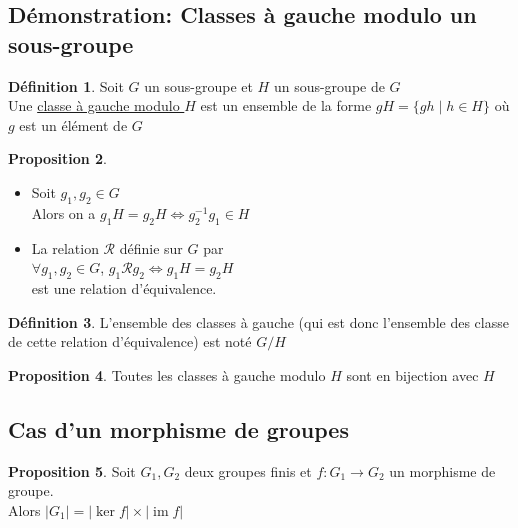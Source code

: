 \documentclass[10pt,a4paper]{article}
\theoremstyle{definition}
\newtheorem{proposition}{Proposition}[section]
\newtheorem{definition}[proposition]{Définition}
\DeclareMathOperator{\im}{im}
\begin{document}
\subsection{Démonstration: Classes à gauche modulo un sous-groupe}
\begin{definition}
Soit $G$ un sous-groupe et $H$ un sous-groupe de $G$ \\
Une \uline{classe à gauche modulo $H$} est un ensemble de la forme $g H = \{ g h \mid h \in H \}$ où $g$ est un élément de $G$
\end{definition}
\begin{proposition}
\begin{itemize}
\item Soit $g_1, g_2 \in G$ \\
Alors on a $g_1 H = g_2 H \iff g_2^{-1} g_1 \in H$
\item La relation $\mathcal{R}$ définie sur $G$ par \\
$\forall g_1, g_2 \in G$, $g_1 \mathcal{R} g_2 \iff g_1 H = g_2 H$ \\
est une relation d'équivalence.
\end{itemize}
\end{proposition}
\begin{definition}
L'ensemble des classes à gauche (qui est donc l'ensemble des classe de cette relation d'équivalence) est noté $G / H$
\end{definition}
\begin{proposition}
Toutes les classes à gauche modulo $H$ sont en bijection avec $H$
\end{proposition}

\subsection{Cas d'un morphisme de groupes}
\begin{proposition}
Soit $G_1, G_2$ deux groupes finis et $f: G_1 \to G_2$ un morphisme de groupe. \\
Alors $\left|G_1\right| = \left|\ker f\right| \times \left|\im f\right|$
\end{proposition}
\end{document}
